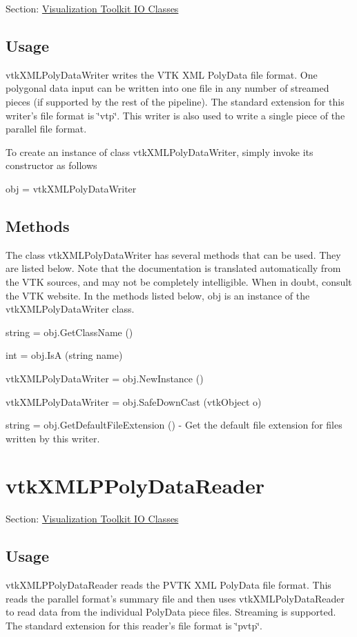 Section\-: \hyperlink{sec_vtkio}{Visualization Toolkit I\-O Classes} \hypertarget{vtkwidgets_vtkxyplotwidget_Usage}{}\subsection{Usage}\label{vtkwidgets_vtkxyplotwidget_Usage}
vtk\-X\-M\-L\-Poly\-Data\-Writer writes the V\-T\-K X\-M\-L Poly\-Data file format. One polygonal data input can be written into one file in any number of streamed pieces (if supported by the rest of the pipeline). The standard extension for this writer's file format is \char`\"{}vtp\char`\"{}. This writer is also used to write a single piece of the parallel file format.

To create an instance of class vtk\-X\-M\-L\-Poly\-Data\-Writer, simply invoke its constructor as follows \begin{DoxyVerb}  obj = vtkXMLPolyDataWriter
\end{DoxyVerb}
 \hypertarget{vtkwidgets_vtkxyplotwidget_Methods}{}\subsection{Methods}\label{vtkwidgets_vtkxyplotwidget_Methods}
The class vtk\-X\-M\-L\-Poly\-Data\-Writer has several methods that can be used. They are listed below. Note that the documentation is translated automatically from the V\-T\-K sources, and may not be completely intelligible. When in doubt, consult the V\-T\-K website. In the methods listed below, {\ttfamily obj} is an instance of the vtk\-X\-M\-L\-Poly\-Data\-Writer class. 
\begin{DoxyItemize}
\item {\ttfamily string = obj.\-Get\-Class\-Name ()}  
\item {\ttfamily int = obj.\-Is\-A (string name)}  
\item {\ttfamily vtk\-X\-M\-L\-Poly\-Data\-Writer = obj.\-New\-Instance ()}  
\item {\ttfamily vtk\-X\-M\-L\-Poly\-Data\-Writer = obj.\-Safe\-Down\-Cast (vtk\-Object o)}  
\item {\ttfamily string = obj.\-Get\-Default\-File\-Extension ()} -\/ Get the default file extension for files written by this writer.  
\end{DoxyItemize}\hypertarget{vtkio_vtkxmlppolydatareader}{}\section{vtk\-X\-M\-L\-P\-Poly\-Data\-Reader}\label{vtkio_vtkxmlppolydatareader}
Section\-: \hyperlink{sec_vtkio}{Visualization Toolkit I\-O Classes} \hypertarget{vtkwidgets_vtkxyplotwidget_Usage}{}\subsection{Usage}\label{vtkwidgets_vtkxyplotwidget_Usage}
vtk\-X\-M\-L\-P\-Poly\-Data\-Reader reads the P\-V\-T\-K X\-M\-L Poly\-Data file format. This reads the parallel format's summary file and then uses vtk\-X\-M\-L\-Poly\-Data\-Reader to read data from the individual Poly\-Data piece files. Streaming is supported. The standard extension for this reader's file format is \char`\"{}pvtp\char`\"{}.

